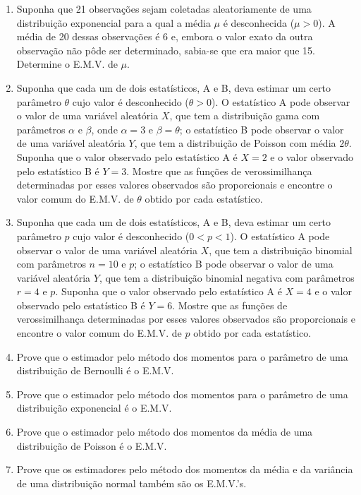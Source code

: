 \begin{enumerate}
    \item Suponha que 21 observações sejam coletadas aleatoriamente de uma distribuição exponencial para a qual a média $\mu$ é desconhecida ($\mu > 0$). A média de 20 dessas observações é 6 e, embora o valor exato da outra observação não pôde ser determinado, sabia-se que era maior que 15. Determine o E.M.V. de $\mu$.
    
    \item Suponha que cada um de dois estatísticos, A e B, deva estimar um certo parâmetro $\theta$ cujo valor é desconhecido ($\theta > 0$). O estatístico A pode observar o valor de uma variável aleatória $X$, que tem a distribuição gama com parâmetros $\alpha$ e $\beta$, onde $\alpha=3$ e $\beta=\theta$; o estatístico B pode observar o valor de uma variável aleatória $Y$, que tem a distribuição de Poisson com média $2\theta$. Suponha que o valor observado pelo estatístico A é $X=2$ e o valor observado pelo estatístico B é $Y=3$. Mostre que as funções de verossimilhança determinadas por esses valores observados são proporcionais e encontre o valor comum do E.M.V. de $\theta$ obtido por cada estatístico.
    
    \item Suponha que cada um de dois estatísticos, A e B, deva estimar um certo parâmetro $p$ cujo valor é desconhecido ($0 < p < 1$). O estatístico A pode observar o valor de uma variável aleatória $X$, que tem a distribuição binomial com parâmetros $n=10$ e $p$; o estatístico B pode observar o valor de uma variável aleatória $Y$, que tem a distribuição binomial negativa com parâmetros $r=4$ e $p$. Suponha que o valor observado pelo estatístico A é $X=4$ e o valor observado pelo estatístico B é $Y=6$. Mostre que as funções de verossimilhança determinadas por esses valores observados são proporcionais e encontre o valor comum do E.M.V. de $p$ obtido por cada estatístico.
    
    \item Prove que o estimador pelo método dos momentos para o parâmetro de uma distribuição de Bernoulli é o E.M.V.
    
    \item Prove que o estimador pelo método dos momentos para o parâmetro de uma distribuição exponencial é o E.M.V.
    
    \item Prove que o estimador pelo método dos momentos da média de uma distribuição de Poisson é o E.M.V.
    
    \item Prove que os estimadores pelo método dos momentos da média e da variância de uma distribuição normal também são os E.M.V.'s.
    

\end{enumerate}
